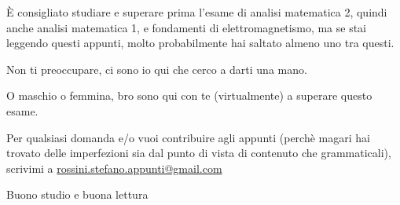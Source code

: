 È consigliato studiare e superare prima l’esame di analisi matematica 2, quindi anche analisi matematica 1,  e fondamenti di elettromagnetismo, ma se stai leggendo questi appunti, molto probabilmente hai saltato almeno uno tra questi. \newline 

Non ti preoccupare, ci sono io qui che cerco a darti una mano. \newline 

O maschio o femmina, bro sono qui con te (virtualmente) a superare questo esame. \newline 

Per qualsiasi domanda e/o vuoi contribuire agli appunti (perchè magari hai trovato delle imperfezioni sia dal punto di vista di contenuto che grammaticali), scrivimi a \href{mailto:rossini.stefano.appunti@gmail.com}{rossini.stefano.appunti@gmail.com} \newline

Buono studio e buona lettura \newline

\newpage 






